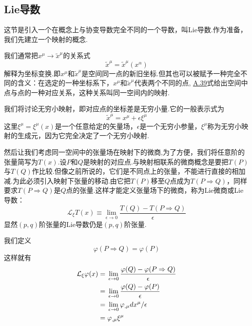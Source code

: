 \documentclass[a4paper]{book}
\begin{document}
\begin{appendix}
\section{Lie导数}
这节是引入一个在概念上与协变导数完全不同的一个导数，叫Lie导数.作为准备，我们先建立一个映射的概念.\par 
我们通常把$x^\mu \rightarrow\tilde{x}^\mu$的关系式
\begin{equation}\label{A.39}
	\tilde{x}^\mu=\tilde{x}^\mu(x^\alpha)
\end{equation}
解释为坐标变换.即$x^\mu$和$\tilde{x}^\mu$是空间同一点的新旧坐标.但其也可以被赋予一种完全不同的含义：在选定的一种坐标系下，$x^\mu$和$\tilde{x}^\mu$代表两个不同的点,
\hyperref[A.39]{A.39}式给出空间中点与点的一种对应关系，这种关系叫同一空间内的映射.\par 
我们将讨论无穷小映射，即对应点的坐标差是无穷小量.它的一般表示式为
\begin{equation}\label{A.40}
	\tilde{x}^\mu=x^\mu+\epsilon\xi^\mu
\end{equation}
这里$\xi^\mu=\xi^\mu(x)$是一个任意给定的矢量场，$\epsilon$是一个无穷小参量，$\xi^\mu$称为无穷小映射的生成元，因为它完全决定了一个无穷小映射.\par 
然后让我们考虑同一空间中的张量场在映射下的微商,为了方便，我们将任意阶的张量简写为$T(x)$.设$P$和$Q$是映射的对应点.与映射相联系的微商概念是要把$T(P)$与$T(Q)$作比较.但像之前所说的，它们是不同点上的张量，不能进行直接的相加减.为此必须引入映射下张量的移动.由它把$T(P)$移至$Q$点成为$T(P\Rightarrow Q)$，同样要求$T(P\Rightarrow Q)$是$Q$点的张量.这样才能定义张量场下的微商，称为Lie微商或Lie导数：
\begin{equation}
	\mathcal{L}_{\xi}T(x)\equiv \lim_{\epsilon\rightarrow 0}\frac{T(Q)-T(P\Rightarrow Q)}{\epsilon}
\end{equation}
显然$(p,q)$阶张量的Lie导数仍是$(p,q)$阶张量.\par
{}\par
我们定义
\begin{equation}
	\varphi(P\Rightarrow Q)=\varphi(P)
\end{equation}
这样就有
\begin{align}\label{A.43}
	\mathcal{L_{\xi}}\varphi(x)={}& \lim_{\epsilon\rightarrow 0}\frac{\varphi(Q)-\varphi(P\Rightarrow Q)}{\epsilon}\notag\\={}&\lim_{\epsilon\rightarrow 0}\frac{\varphi(Q)-\varphi(P)}{\epsilon}\notag\\={}&\lim_{\epsilon\rightarrow 0}\varphi_{,\mu}dx^\mu/\epsilon\notag\\={}&\varphi_{,\mu}\xi^\mu

\end{align}
\end{appendix}
\end{document}
